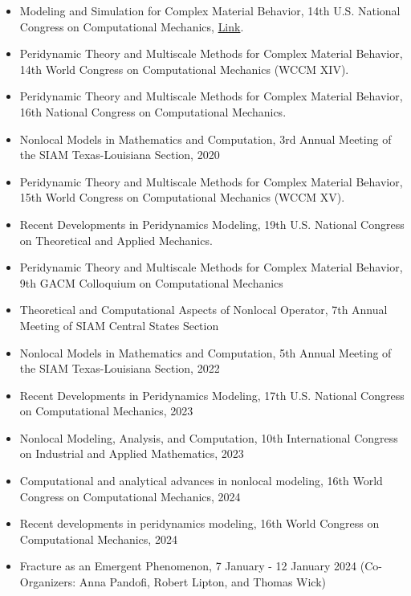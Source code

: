 \documentclass[11pt,a4paper,sans]{moderncv}
\begin{document}
\begin{itemize}[leftmargin=4cm]
\item Modeling and Simulation for Complex Material Behavior, 14th U.S. National Congress on Computational Mechanics, \href{http://14.usnccm.org/MS402}{Link}.
\item Peridynamic Theory and Multiscale Methods for Complex Material Behavior, 14th World Congress on Computational Mechanics (WCCM XIV).
\item Peridynamic Theory and Multiscale Methods for Complex Material Behavior, 16th National Congress on Computational Mechanics. 
\item Nonlocal Models in Mathematics and Computation, 3rd Annual Meeting of the SIAM Texas-Louisiana Section, 2020 
\item Peridynamic Theory and Multiscale Methods for Complex Material Behavior, 15th World Congress on Computational Mechanics (WCCM XV).
\item Recent Developments in Peridynamics Modeling, 19th U.S. National Congress on Theoretical and Applied Mechanics.
\item  Peridynamic Theory and Multiscale Methods for Complex Material Behavior,  9th GACM Colloquium on Computational Mechanics
\item Theoretical and Computational Aspects of Nonlocal Operator, 7th Annual Meeting of SIAM Central States Section
\item Nonlocal Models in Mathematics and Computation, 5th Annual Meeting of the SIAM Texas-Louisiana Section, 2022
\item  Recent Developments in Peridynamics Modeling, 17th U.S. National Congress on Computational Mechanics, 2023
\item Nonlocal Modeling, Analysis, and Computation, 10th International Congress on Industrial and Applied Mathematics, 2023
\item Computational and analytical advances in nonlocal modeling, 16th World Congress on Computational Mechanics, 2024
\item Recent developments in peridynamics modeling, 16th World Congress on Computational Mechanics, 2024
\end{itemize}

\begin{itemize}[leftmargin=4cm]
\item Fracture as an Emergent Phenomenon, 7 January - 12 January 2024 (Co-Organizers: Anna Pandofi, Robert Lipton, and Thomas Wick)

\end{itemize}
\end{document}
